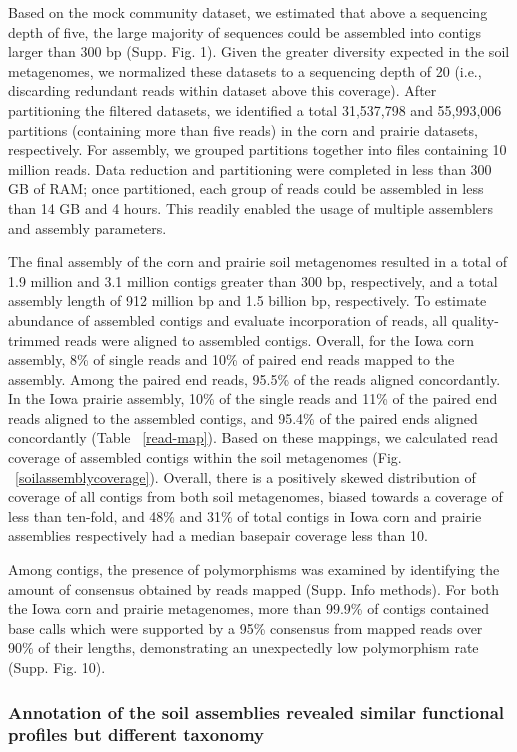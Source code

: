 \documentclass[11pt]{article} %
\begin{document}
Based on the mock community dataset, we estimated that above a
sequencing depth of five, the large majority of sequences could be
assembled into contigs larger than 300 bp (Supp. Fig. 1).  Given the
greater diversity expected in the soil metagenomes, we normalized
these datasets to a sequencing depth of 20 (i.e., discarding redundant 
reads within dataset above this coverage).  
After partitioning the filtered datasets, we identified a total
31,537,798 and 55,993,006 partitions (containing more than five reads)
in the corn and prairie datasets, respectively.  For assembly, we
grouped partitions together into files containing 10 million reads.
Data reduction and partitioning were completed in less than 300 GB of
RAM; once partitioned, each group of reads could be assembled in less
than 14 GB and 4 hours.  This readily enabled the usage of multiple
assemblers and assembly parameters.

The final assembly of the corn and prairie soil metagenomes resulted
in a total of 1.9 million and 3.1 million contigs greater than 300 bp,
respectively, and a total assembly length of 912 million bp and 1.5
billion bp, respectively.  To estimate abundance of assembled contigs
and evaluate incorporation of reads, all quality-trimmed reads were
aligned to assembled contigs.  Overall, for the Iowa corn assembly,
8\% of single reads and 10\% of paired end reads mapped to the
assembly.  Among the paired end reads, 95.5\% of the reads aligned
concordantly.  In the Iowa prairie assembly, 10\% of the single reads
and 11\% of the paired end reads aligned to the assembled contigs, and
95.4\% of the paired ends aligned concordantly (Table
~\ref{read-map}).  Based on these mappings, we calculated read
coverage of assembled contigs within the soil metagenomes
(Fig. ~\ref{soilassemblycoverage}).  Overall, there is a positively
skewed distribution of coverage of all contigs from both soil
metagenomes, biased towards a coverage of less than ten-fold, and 48\%
and 31\% of total contigs in Iowa corn and prairie assemblies
respectively had a median basepair coverage less than 10.

Among contigs, the presence of polymorphisms was examined by
identifying the amount of consensus obtained by reads mapped
(Supp. Info methods).  For both the Iowa corn and prairie metagenomes,
more than 99.9\% of contigs contained base calls which were supported
by a 95\% consensus from mapped reads over 90\% of their lengths,
demonstrating an unexpectedly low polymorphism rate
(Supp. Fig. 10).
 

\subsubsection{Annotation of the soil assemblies revealed similar functional
profiles but different taxonomy}
 
\end{document}
